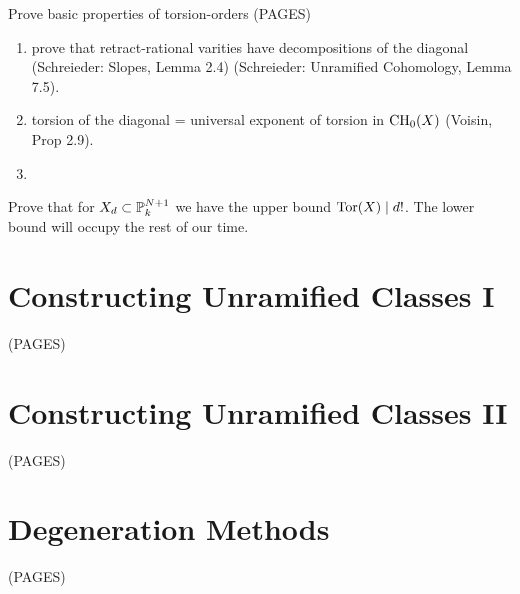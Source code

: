\documentclass[12pt]{article}
\DeclareMathOperator{\torsion}{\mathrm{Tor}}
\begin{document}
Prove basic properties of torsion-orders (PAGES)
\begin{enumerate}
\item prove that retract-rational varities have decompositions of the diagonal (Schreieder: Slopes, Lemma 2.4) (Schreieder: Unramified Cohomology, Lemma 7.5).

\item torsion of the diagonal = universal exponent of torsion in $\CH_0(X)$ (Voisin, Prop 2.9).

\item 
\end{enumerate}
Prove that for $X_d \subset \P^{N+1}_k$ we have the upper bound $\torsion(X) \divides d!$. The lower bound will occupy the rest of our time.

\section{Constructing Unramified Classes I}

(PAGES)

\section{Constructing Unramified Classes II}

(PAGES)

\section{Degeneration Methods}

(PAGES)
\end{document}
